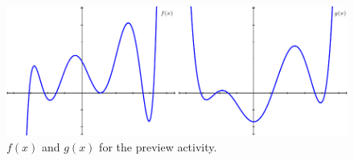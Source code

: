 \begin{pa}
\begin{figure}[ht!]
	\begin{center}
        \includegraphics[width=0.9\columnwidth]{figures/0-6-fig1.pdf}
	\end{center}      
\caption{$f(x)$ and $g(x)$ for the preview activity.}
\label{fig:0.6.PA}
\end{figure}


\end{pa} \afterpa

